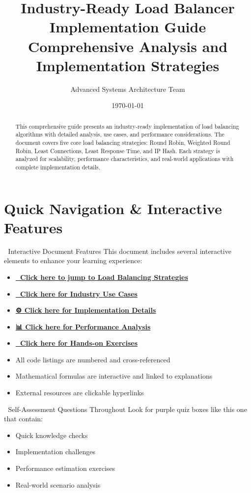 \documentclass[12pt,a4paper]{article}
\title{\textbf{Industry-Ready Load Balancer Implementation Guide} \\ 
       \large Comprehensive Analysis and Implementation Strategies}
\author{Advanced Systems Architecture Team}
\date{\today}
\begin{document}
\maketitle

\begin{abstract}
This comprehensive guide presents an industry-ready implementation of load balancing algorithms with detailed analysis, use cases, and performance considerations. The document covers five core load balancing strategies: Round Robin, Weighted Round Robin, Least Connections, Least Response Time, and IP Hash. Each strategy is analyzed for scalability, performance characteristics, and real-world applications with complete implementation details.
\end{abstract}

\tableofcontents
\newpage

\section*{Quick Navigation \& Interactive Features}

\begin{infobox}{🎯 Interactive Document Features}
This document includes several interactive elements to enhance your learning experience:
\begin{itemize}
    \item \textbf{\hyperref[sec:strategies]{🔄 Click here to jump to Load Balancing Strategies}}
    \item \textbf{\hyperref[sec:usecases]{💼 Click here for Industry Use Cases}}
    \item \textbf{\hyperref[sec:implementation]{⚙️ Click here for Implementation Details}}
    \item \textbf{\hyperref[sec:performance]{📊 Click here for Performance Analysis}}
    \item \textbf{\hyperref[sec:exercises]{🧠 Click here for Hands-on Exercises}}
    \item All code listings are numbered and cross-referenced
    \item Mathematical formulas are interactive and linked to explanations
    \item External resources are clickable hyperlinks
\end{itemize}
\end{infobox}

\begin{quizbox}{📝 Self-Assessment Questions Throughout}
Look for purple quiz boxes like this one that contain:
\begin{itemize}
    \item Quick knowledge checks
    \item Implementation challenges  
    \item Performance estimation exercises
    \item Real-world scenario analysis
\end{itemize}
\end{quizbox}
\end{document}
